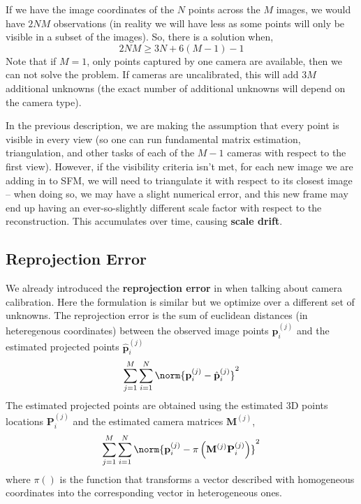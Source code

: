 If we have the image coordinates of the $N$ points across the $M$ images, we would have $2NM$ observations (in reality we will have less as some points will only be visible in a subset of the images). So, there is a solution when,
\begin{equation}
2NM \geq 3N + 6(M-1)-1
\end{equation}
Note that if $M=1$, only points captured by one camera are available, then we can not solve the problem. If cameras are uncalibrated, this will add $3M$ additional unknowns (the exact number of additional unknowns will depend on the camera type). 

In the previous description, we are making the assumption that every point is visible in every view (so one can run fundamental matrix estimation, triangulation, and other tasks of each of the $M-1$ cameras with respect to the first view). However, if the visibility criteria isn’t met, for each new image we are adding in to SFM, we will need to triangulate it with respect to its closest image -- when doing so, we may have a slight numerical error, and this new frame may end up having an ever-so-slightly different scale factor with respect to the reconstruction. This accumulates over time, causing {\bf scale drift}.


\subsection{Reprojection Error}


We already introduced the {\bf reprojection error} in \sect{\ref{sec:cam_cal_minimizing_reprojection_error}} when talking about camera calibration. Here the formulation is similar but we optimize over a different set of unknowns. %
The reprojection error is the sum of euclidean distances (in heteregenous coordinates) between the observed image points $\mathbf{p}^{(j)}_i$ and the estimated projected points $\hat{\mathbf{p}}^{(j)}_i$
\begin{equation}
\sum_{j=1}^M \sum_{i=1}^N 
\norm{ 
\mathbf{p}^{(j)}_i - \hat{\mathbf{p}}^{(j)}_i 
}
^2 
\end{equation}
The estimated projected points are obtained using the estimated 3D points locations $\mathbf{P}^{(j)}_i$ and the estimated camera matrices $\mathbf{M}^{(j)}$,
\begin{equation}
\sum_{j=1}^M \sum_{i=1}^N 
\norm{ 
\mathbf{p}^{(j)}_i - 
\pi \left( 
\mathbf{M}^{(j)} \mathbf{P}^{(j)}_i 
\right)  
} ^2 
\label{eq:sfm:rep_error}
\end{equation}
where $\pi()$ is the function that transforms a vector described with homogeneous coordinates into the corresponding vector in heterogeneous ones. 

